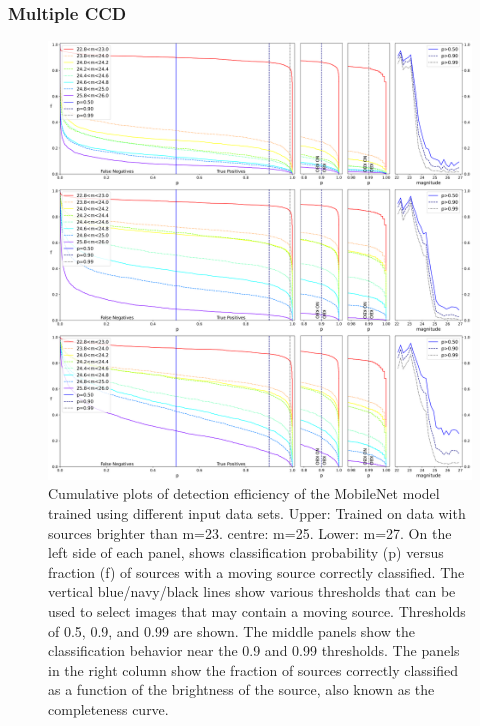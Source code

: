 \documentclass{aastex631}
\begin{document}
\subsubsection{Multiple CCD}
\label{subsubsect:MultipleChips}

\begin{figure}[ht]
\includegraphics[width=\textwidth,keepaspectratio]{Figures/completeness_positives.png} \caption{Cumulative plots of detection efficiency of the MobileNet model trained using different input data sets.
Upper: Trained on data with sources brighter than m=23. centre: m=25. Lower: m=27.
On the left side of each panel, shows classification probability (p) versus fraction (f) of sources with a moving source correctly classified. 
The vertical blue/navy/black lines show various thresholds that can be used to select images that may contain a moving source.
Thresholds of 0.5, 0.9, and 0.99 are shown.
The middle panels show the classification behavior near the 0.9 and 0.99 thresholds.
The panels in the right column show the fraction of sources correctly classified as a function of the brightness of the source, also known as the completeness curve. \label{fig:completeness single}} 
\end{figure}
\end{document}
